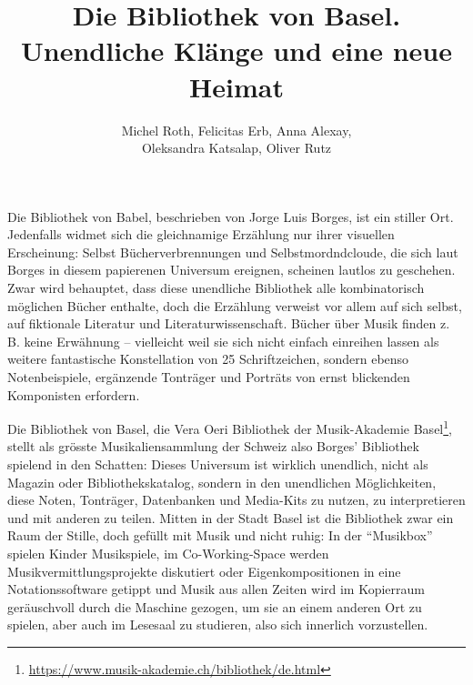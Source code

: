 \documentclass[a4paper,
fontsize=11pt,
oneside,
numbers=noperiodatend,
parskip=half-,
bibliography=totoc,
final
]{scrartcl}
\title{\LARGE{Die Bibliothek von Basel. Unendliche Klänge und eine neue Heimat}}%
\author{Michel Roth, Felicitas Erb, Anna Alexay, \\ Oleksandra Katsalap, Oliver Rutz} %
\date{}
\begin{document}
\maketitle
\thispagestyle{fancyplain} 


Die Bibliothek von Babel, beschrieben von Jorge Luis Borges, ist ein
stiller Ort. Jedenfalls widmet sich die gleichnamige Erzählung nur ihrer
visuellen Erscheinung: Selbst Bücherverbrennungen und
Selbstmordndcloude, die sich laut Borges in diesem papierenen Universum
ereignen, scheinen lautlos zu geschehen. Zwar wird behauptet, dass diese
unendliche Bibliothek alle kombinatorisch möglichen Bücher enthalte,
doch die Erzählung verweist vor allem auf sich selbst, auf fiktionale
Literatur und Literaturwissenschaft. Bücher über Musik finden z. B.
keine Erwähnung -- vielleicht weil sie sich nicht einfach einreihen
lassen als weitere fantastische Konstellation von 25 Schriftzeichen,
sondern ebenso Notenbeispiele, ergänzende Tonträger und Porträts von
ernst blickenden Komponisten erfordern.

Die Bibliothek von Basel, die Vera Oeri Bibliothek der Musik-Akademie
Basel\footnote{\url{https://www.musik-akademie.ch/bibliothek/de.html}},
stellt als grösste Musikaliensammlung der Schweiz also Borges'
Bibliothek spielend in den Schatten: Dieses Universum ist wirklich
unendlich, nicht als Magazin oder Bibliothekskatalog, sondern in den
unendlichen Möglichkeiten, diese Noten, Tonträger, Datenbanken und
Media-Kits zu nutzen, zu interpretieren und mit anderen zu teilen.
Mitten in der Stadt Basel ist die Bibliothek zwar ein Raum der Stille,
doch gefüllt mit Musik und nicht ruhig: In der \enquote{Musikbox}
spielen Kinder Musikspiele, im Co-Working-Space werden
Musikvermittlungsprojekte diskutiert oder Eigenkompositionen in eine
Notationssoftware getippt und Musik aus allen Zeiten wird im Kopierraum
geräuschvoll durch die Maschine gezogen, um sie an einem anderen Ort zu
spielen, aber auch im Lesesaal zu studieren, also sich innerlich
vorzustellen.
\end{document}
